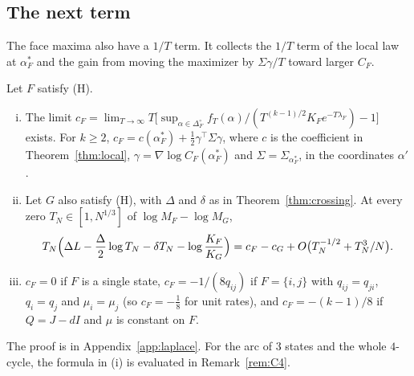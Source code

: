 \subsection{The next term}

The face maxima also have a $1/T$ term. It collects the $1/T$ term of the
local law at $\alpha^*_F$ and the gain from moving the maximizer by
$\Sigma\gamma/T$ toward larger $C_F$.

\begin{proposition}\label{prop:thirdorder}
Let $F$ satisfy (H).
\begin{enumerate}[(i)]
\item The limit
$c_F=\lim_{T\to\infty}T\bigl[\sup_{\alpha\in\Delta_F^\circ}f_T(\alpha)/
(T^{(k-1)/2}K_Fe^{-T\lambda_F})-1\bigr]$ exists. For $k\ge2$,
$c_F=c(\alpha^*_F)+\frac12\gamma^\top\Sigma\gamma$, where $c$ is the
coefficient in Theorem~\ref{thm:local}, $\gamma=\nabla\log C_F(\alpha^*_F)$
and $\Sigma=\Sigma_{\alpha^*_F}$, in the coordinates $\alpha'$.
\item Let $G$ also satisfy (H), with $\Delta$ and $\delta$ as in
Theorem~\ref{thm:crossing}. At every zero $T_N\in[1,N^{1/3}]$ of
$\log M_F-\log M_G$,
\[
T_N\Bigl(\Delta L-\frac\Delta2\log T_N-\delta T_N-\log\frac{K_F}{K_G}\Bigr)
=c_F-c_G+O\bigl(T_N^{-1/2}+T_N^3/N\bigr).
\]
\item $c_F=0$ if $F$ is a single state, $c_F=-1/(8q_{ij})$ if $F=\{i,j\}$
with $q_{ij}=q_{ji}$, $q_i=q_j$ and $\mu_i=\mu_j$ (so $c_F=-\frac18$ for unit
rates), and $c_F=-(k-1)/8$ if $Q=J-dI$ and $\mu$ is constant on $F$.
\end{enumerate}
\end{proposition}

The proof is in Appendix~\ref{app:laplace}. For the arc of $3$ states and the
whole $4$-cycle, the formula in (i) is evaluated in Remark~\ref{rem:C4}.
